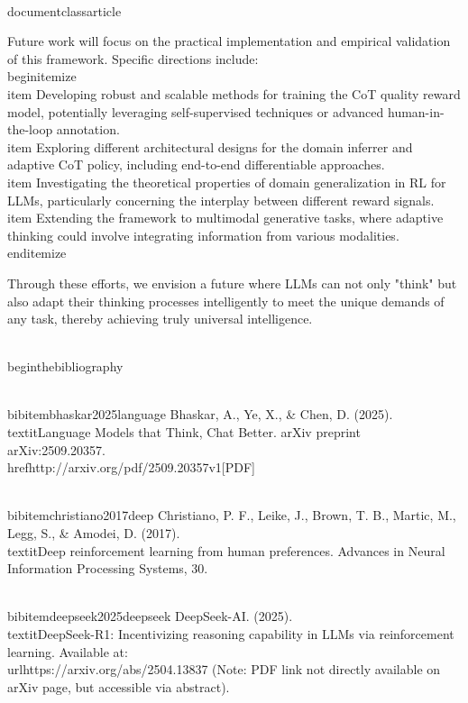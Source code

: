 \\documentclass{article}
\begin{document}
Future work will focus on the practical implementation and empirical validation of this framework. Specific directions include:
\\begin{itemize}
    \\item Developing robust and scalable methods for training the CoT quality reward model, potentially leveraging self-supervised techniques or advanced human-in-the-loop annotation.
    \\item Exploring different architectural designs for the domain inferrer and adaptive CoT policy, including end-to-end differentiable approaches.
    \\item Investigating the theoretical properties of domain generalization in RL for LLMs, particularly concerning the interplay between different reward signals.
    \\item Extending the framework to multimodal generative tasks, where adaptive thinking could involve integrating information from various modalities.
\\end{itemize}

Through these efforts, we envision a future where LLMs can not only "think" but also adapt their thinking processes intelligently to meet the unique demands of any task, thereby achieving truly universal intelligence.

\
\\begin{thebibliography}{9}

\\bibitem{bhaskar2025language}
Bhaskar, A., Ye, X., \& Chen, D. (2025).
\\textit{Language Models that Think, Chat Better}.
arXiv preprint arXiv:2509.20357.
\\href{http://arxiv.org/pdf/2509.20357v1}{[PDF]}

\\bibitem{christiano2017deep}
Christiano, P. F., Leike, J., Brown, T. B., Martic, M., Legg, S., \& Amodei, D. (2017).
\\textit{Deep reinforcement learning from human preferences}.
Advances in Neural Information Processing Systems, 30.

\\bibitem{deepseek2025deepseek}
DeepSeek-AI. (2025).
\\textit{DeepSeek-R1: Incentivizing reasoning capability in LLMs via reinforcement learning}.
Available at: \\url{https://arxiv.org/abs/2504.13837} (Note: PDF link not directly available on arXiv page, but accessible via abstract).
\end{document}
